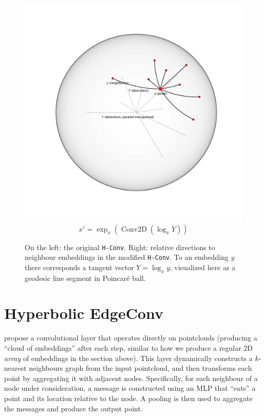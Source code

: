 \begin{figure}
\begin{minipage}{\textwidth}
\begin{minipage}[c][8cm][c]{\dimexpr0.5\textwidth-0.5\Colsep\relax}
            \includegraphics[width=.85\linewidth]{art/relative-locations.pdf}
            \[ x' = \exp_x\left(
                \operatorname{Conv2D}\left(
                    \log_x Y\right)\right) \]
        \end{minipage}%
    \end{minipage}
    \caption{On the left: the original \texttt{H-Conv}.
    Right: relative directions to neighbour embeddings in the modified
    \texttt{H-Conv}. To an embedding \( y \) there corresponds a tangent vector
    \( Y = \log_x y \), visualized here as a geodesic line segment in
    Poincar\'e ball.}
\end{figure}

\section{Hyperbolic EdgeConv} \label{sec:hedgeconv}

\citet{edgeconv} propose a convolutional layer that operates directly on
pointclouds (producing a ``cloud of embeddings'' after each step, similar to
how we produce a regular \( 2 \)D \emph{array} of embeddings in the section
above). This layer dynamically constructs a \( k \)-nearest neighbours graph
from the input pointcloud, and then transforms each point by aggregating it
with adjacent nodes. Specifically, for each neighbour of a node under
consideration, a message is constructed using an MLP that ``eats'' a point and its
location relative to the node. A pooling is then used to aggregate the messages
and produce the output point.

